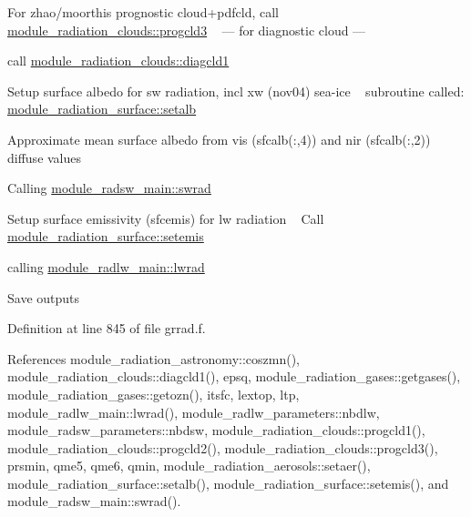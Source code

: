 \begin{DoxyEnumerate}
\begin{DoxyItemize}
\item For zhao/moorthi\textquotesingle{}s prognostic cloud+pdfcld, call \hyperlink{group__module__radiation__clouds_ga51a721a68d1bb9f5b2d8b1541aacf28d}{module\+\_\+radiation\+\_\+clouds\+::progcld3} ~\newline
 --- for diagnostic cloud ---
\item call \hyperlink{group__module__radiation__clouds_gab477be986b08fe827c44dbe352a23d39}{module\+\_\+radiation\+\_\+clouds\+::diagcld1}
\end{DoxyItemize}
\item Setup surface albedo for sw radiation, incl xw (nov04) sea-\/ice ~\newline
 subroutine called\+: \hyperlink{group__module__radiation__surface_ga0db1853de27009e91e016ca940839001}{module\+\_\+radiation\+\_\+surface\+::setalb}
\item Approximate mean surface albedo from vis (sfcalb(\+:,4)) and nir (sfcalb(\+:,2)) diffuse values
\item Calling \hyperlink{group__module__radsw__main_ga1186b2e2f7ebd5fb6dfbb43222d3ab3c}{module\+\_\+radsw\+\_\+main\+::swrad}
\item Setup surface emissivity (sfcemis) for lw radiation ~\newline
 Call \hyperlink{group__module__radiation__surface_gae6b9cfae267270c6b338e5edafdd2456}{module\+\_\+radiation\+\_\+surface\+::setemis}
\item calling \hyperlink{group__module__radlw__main_gacff9ff756859e9abcd3905c7725fdff3}{module\+\_\+radlw\+\_\+main\+::lwrad}
\item Save outputs 
\end{DoxyEnumerate}

Definition at line 845 of file grrad.\+f.



References module\+\_\+radiation\+\_\+astronomy\+::coszmn(), module\+\_\+radiation\+\_\+clouds\+::diagcld1(), epsq, module\+\_\+radiation\+\_\+gases\+::getgases(), module\+\_\+radiation\+\_\+gases\+::getozn(), itsfc, lextop, ltp, module\+\_\+radlw\+\_\+main\+::lwrad(), module\+\_\+radlw\+\_\+parameters\+::nbdlw, module\+\_\+radsw\+\_\+parameters\+::nbdsw, module\+\_\+radiation\+\_\+clouds\+::progcld1(), module\+\_\+radiation\+\_\+clouds\+::progcld2(), module\+\_\+radiation\+\_\+clouds\+::progcld3(), prsmin, qme5, qme6, qmin, module\+\_\+radiation\+\_\+aerosols\+::setaer(), module\+\_\+radiation\+\_\+surface\+::setalb(), module\+\_\+radiation\+\_\+surface\+::setemis(), and module\+\_\+radsw\+\_\+main\+::swrad().



